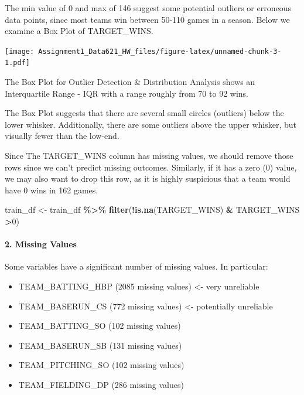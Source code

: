 \documentclass[
]{article}
\newenvironment{Shaded}{\begin{snugshade}}{\end{snugshade}}
\newcommand{\AttributeTok}[1]{\textcolor[rgb]{0.13,0.29,0.53}{#1}}
\newcommand{\DecValTok}[1]{\textcolor[rgb]{0.00,0.00,0.81}{#1}}
\newcommand{\FunctionTok}[1]{\textcolor[rgb]{0.13,0.29,0.53}{\textbf{#1}}}
\newcommand{\NormalTok}[1]{#1}
\newcommand{\OtherTok}[1]{\textcolor[rgb]{0.56,0.35,0.01}{#1}}
\newcommand{\SpecialCharTok}[1]{\textcolor[rgb]{0.81,0.36,0.00}{\textbf{#1}}}
\newcommand{\StringTok}[1]{\textcolor[rgb]{0.31,0.60,0.02}{#1}}
\providecommand{\tightlist}{%
  \setlength{\itemsep}{0pt}\setlength{\parskip}{0pt}}
\begin{document}
The min value of 0 and max of 146 suggest some potential outliers or
erroneous data points, since most teams win between 50-110 games in a
season. Below we examine a Box Plot of TARGET\_WINS.

\begin{Shaded}
\end{Shaded}

\texttt{[image: Assignment1\_Data621\_HW\_files/figure-latex/unnamed-chunk-3-1.pdf]}

The Box Plot for Outlier Detection \& Distribution Analysis shows an
Interquartile Range - IQR with a range roughly from 70 to 92 wins.

The Box Plot suggests that there are several small circles (outliers)
below the lower whisker. Additionally, there are some outliers above the
upper whisker, but visually fewer than the low-end.

Since The TARGET\_WINS column has missing values, we should remove those
rows since we can't predict missing outcomes. Similarly, if it has a
zero (0) value, we may also want to drop this row, as it is highly
suspicious that a team would have 0 wins in 162 games.

\begin{Shaded}
\begin{Highlighting}[]
\NormalTok{train\_df }\OtherTok{\textless{}{-}}\NormalTok{ train\_df }\SpecialCharTok{\%\textgreater{}\%} 
  \FunctionTok{filter}\NormalTok{(}\SpecialCharTok{!}\FunctionTok{is.na}\NormalTok{(TARGET\_WINS) }\SpecialCharTok{\&}\NormalTok{ TARGET\_WINS }\SpecialCharTok{\textgreater{}}\DecValTok{0}\NormalTok{)}
\end{Highlighting}
\end{Shaded}

\paragraph{2. Missing Values}\label{missing-values}

Some variables have a significant number of missing values. In
particular:

\begin{itemize}
\tightlist
\item
  TEAM\_BATTING\_HBP (2085 missing values) \textless- very unreliable
\item
  TEAM\_BASERUN\_CS (772 missing values) \textless- potentially
  unreliable
\item
  TEAM\_BATTING\_SO (102 missing values)
\item
  TEAM\_BASERUN\_SB (131 missing values)
\item
  TEAM\_PITCHING\_SO (102 missing values)
\item
  TEAM\_FIELDING\_DP (286 missing values)
\end{itemize}
\end{document}
